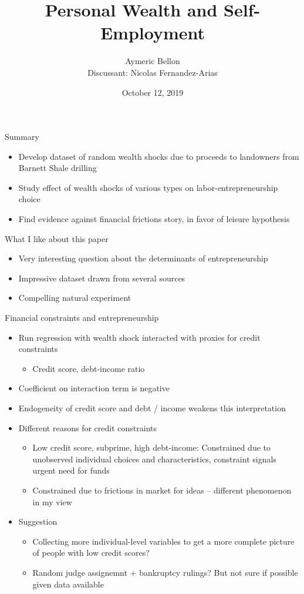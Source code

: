 \documentclass[english,usenames,dvipsnames]{beamer}
\title{Personal Wealth and Self-Employment}
\author{Aymeric Bellon \\ Discussant: Nicolas Fernandez-Arias}
\date{October 12, 2019}
\begin{document}
	
\maketitle

\begin{frame}{Summary}
\begin{itemize}
	\item Develop dataset of random wealth shocks due to proceeds to landowners from Barnett Shale drilling
	\item Study effect of wealth shocks of various types on labor-entrepreneurship choice
	\item Find evidence against financial frictions story, in favor of leisure hypothesis
\end{itemize}
\end{frame}

\begin{frame}{What I like about this paper}
\begin{itemize}
	\item Very interesting question about the determinants of entrepreneurship
	\item Impressive dataset drawn from several sources
	\item Compelling natural experiment
\end{itemize}
\end{frame}


\begin{frame}{Financial constraints and entrepreneurship}
\begin{itemize}
	\item Run regression with wealth shock interacted with proxies for credit constraints
	\begin{itemize}
		\item Credit score, debt-income ratio
	\end{itemize}
	\item Coefficient on interaction term is negative
	\item Endogeneity of credit score and debt / income weakens this interpretation
	\item Different reasons for credit constraints
	\begin{itemize}
		\item Low credit score, subprime, high debt-income: Constrained due to unobserved individual choices and characteristics, constraint signals urgent need for funds
		\item Constrained due to frictions in market for ideas -- different phenomenon in my view
	\end{itemize}
	\item Suggestion
	\begin{itemize}
		\item Collecting more individual-level variables to get a more complete picture of people with low credit scores?
		\item Random judge assignemnt + bankruptcy rulings? But not sure if possible given data available
	\end{itemize}
\end{itemize}
\end{frame}
\end{document}
